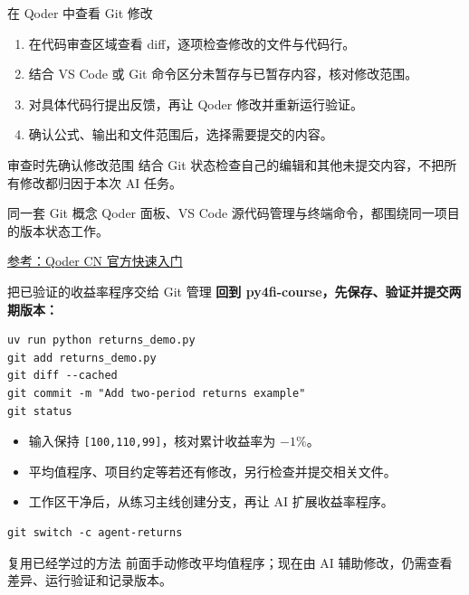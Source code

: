 \documentclass[9pt]{ctexbeamer}
\begin{document}
\begin{frame}{在 Qoder 中查看 Git 修改}
  \begin{enumerate}
    \item 在代码审查区域查看 diff，逐项检查修改的文件与代码行。
    \item 结合 VS Code 或 Git 命令区分未暂存与已暂存内容，核对修改范围。
    \item 对具体代码行提出反馈，再让 Qoder 修改并重新运行验证。
    \item 确认公式、输出和文件范围后，选择需要提交的内容。
  \end{enumerate}
  \begin{block}{审查时先确认修改范围}
    结合 Git 状态检查自己的编辑和其他未提交内容，不把所有修改都归因于本次 AI 任务。
  \end{block}
  \begin{block}{同一套 Git 概念}
    Qoder 面板、VS Code 源代码管理与终端命令，都围绕同一项目的版本状态工作。
  \end{block}
  {\tiny\href{https://docs.qoder.cn/qoder/quickstart}{参考：Qoder CN 官方快速入门}}
\end{frame}

\begin{frame}[fragile]{把已验证的收益率程序交给 Git 管理}
  \textbf{回到 py4fi-course，先保存、验证并提交两期版本：}
\begin{lstlisting}[language={},numbers=none]
uv run python returns_demo.py
git add returns_demo.py
git diff --cached
git commit -m "Add two-period returns example"
git status
\end{lstlisting}
  \begin{itemize}
    \item 输入保持 \texttt{[100,110,99]}，核对累计收益率为 $-1\%$。
    \item 平均值程序、项目约定等若还有修改，另行检查并提交相关文件。
    \item 工作区干净后，从练习主线创建分支，再让 AI 扩展收益率程序。
  \end{itemize}
\begin{lstlisting}[language={},numbers=none]
git switch -c agent-returns
\end{lstlisting}
  \begin{block}{复用已经学过的方法}
    前面手动修改平均值程序；现在由 AI 辅助修改，仍需查看差异、运行验证和记录版本。
  \end{block}
\end{frame}
\end{document}

